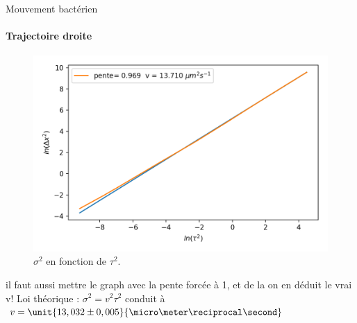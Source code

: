 \documentclass[11pt]{beamer}
\begin{document}
\begin{frame}{Mouvement bactérien}
\framesubtitle{Trajectoire droite}

\begin{figure}
\includegraphics[width=0.6\linewidth]{vitesse_v_log_pente_non_forcee1.png}
\caption{$\sigma ^2$ en fonction de $\tau ^2$.}
\end{figure}
il faut aussi mettre le graph avec la pente forcée à 1, et de la on en déduit le vrai v!
Loi théorique : $\sigma ^2 = v^2\tau ^2$ conduit à $v = \unit{13,032 \pm 0,005}{\micro\meter\reciprocal\second}$
\end{frame}
\end{document}
